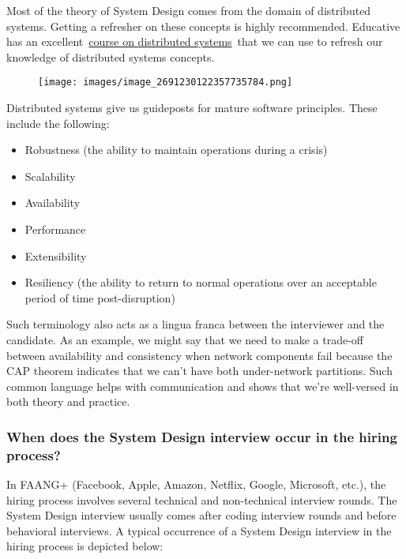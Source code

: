 Most of the theory of System Design comes from the domain of distributed systems. Getting a refresher on these concepts is highly recommended. Educative has an excellent~\href{https://www.educative.io/courses/distributed-systems-practitioners}{course on distributed systems}~that we can use to refresh our knowledge of distributed systems concepts.

\begin{figure}[htbp]
    \centering
    \texttt{[image: images/image\_2691230122357735784.png]}
    
\end{figure}

Distributed systems give us guideposts for mature software principles. These include the following: \begin{itemize} \item {}\label{8kWi4A5f2dvVaS_hyGAi2} Robustness (the ability to maintain operations during a crisis) \item {}\label{n3X5NCP6M5Okm3RpeZFRy} Scalability \item {}\label{wgHfXTx2euzdgaOwBdrv_} Availability \item {}\label{Ao7XJxlae4646PY6EfSGQ} Performance \item {}\label{UY-ZFRoBhpqHsi-D-u2X5} Extensibility \item {}\label{2T30P2o-IzhDNLgBA_m8P} Resiliency (the ability to return to normal operations over an acceptable period of time post-disruption) \end{itemize} Such terminology also acts as a lingua franca between the interviewer and the candidate. As an example, we might say that we need to make a trade-off between availability and consistency when network components fail because the CAP theorem indicates that we can't have both under-network partitions. Such common language helps with communication and shows that we're well-versed in both theory and practice. \subsubsection{When does the System Design interview occur in the hiring process?}\label{When-does-the-System-Design-interview-occur-in-the-hiring-process} In FAANG+ (Facebook, Apple, Amazon, Netflix, Google, Microsoft, etc.), the hiring process involves several technical and non-technical interview rounds. The System Design interview usually comes after coding interview rounds and before behavioral interviews. A typical occurrence of a System Design interview in the hiring process is depicted below:

